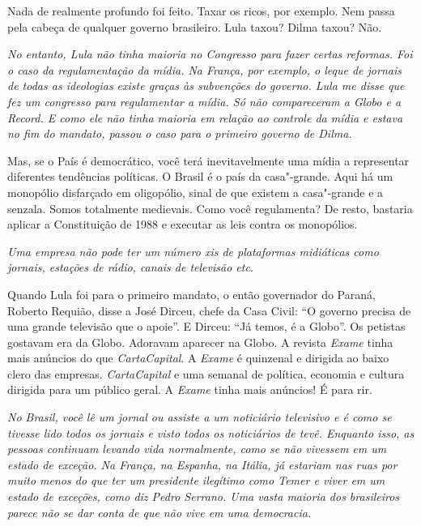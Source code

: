 \normalfont 
Nada de realmente profundo foi feito. Taxar os ricos, por
exemplo. Nem passa pela cabeça de qualquer governo brasileiro. Lula
taxou? Dilma taxou? Não.

\itshape
No entanto, Lula não tinha maioria no Congresso para
fazer certas reformas. Foi o caso da regulamentação da mídia. Na França,
por exemplo, o leque de jornais de todas as ideologias existe graças às
subvenções do governo. Lula me disse que fez um congresso para
regulamentar a mídia. Só não compareceram a Globo e a Record. E como ele
não tinha maioria em relação ao controle da mídia e estava no fim do
mandato, passou o caso para o primeiro governo de Dilma.

\normalfont 
Mas, se o País é democrático, você terá inevitavelmente
uma mídia a representar diferentes tendências políticas. O Brasil é o
país da casa"-grande. Aqui há um monopólio disfarçado em oligopólio,
sinal de que existem a casa"-grande e a senzala. Somos totalmente
medievais. Como você regulamenta? De resto, bastaria aplicar a
Constituição de 1988 e executar as leis contra os monopólios.

\itshape
Uma empresa não pode ter um número xis de plataformas
midiáticas como jornais, estações de rádio, canais de televisão etc.

\normalfont 
Quando Lula foi para o primeiro mandato, o então
governador do Paraná, Roberto Requião, disse a José Dirceu, chefe da
Casa Civil: ``O governo precisa de uma grande televisão que o apoie''. E
Dirceu: ``Já temos, é a Globo''. Os petistas gostavam era da Globo.
Adoravam aparecer na Globo. A revista \emph{Exame} tinha mais anúncios
do que \emph{CartaCapital}. A \emph{Exame} é quinzenal e dirigida ao
baixo clero das empresas. \emph{CartaCapital} e uma semanal de política,
economia e cultura dirigida para um público geral. A \emph{Exame} tinha
mais anúncios! É para rir.

\itshape
No Brasil, você lê um jornal ou assiste a um noticiário
televisivo e é como se tivesse lido todos os jornais e visto todos os
noticiários de tevê. Enquanto isso, as pessoas continuam levando vida
normalmente, como se não vivessem em um estado de exceção. Na França, na
Espanha, na Itália, já estariam nas ruas por muito menos do que ter um
presidente ilegítimo como Temer e viver em um estado de exceções, como
diz Pedro Serrano. Uma vasta maioria dos brasileiros parece não se dar
conta de que não vive em uma democracia.

